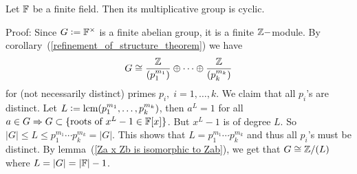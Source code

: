 \begin{dang}
    \begin{theorem}\label{multiplicative group of a finite field is cyclic}
        Let $\mathbb{F}$ be a finite field. Then its multiplicative group is cyclic.
    \end{theorem}
\end{dang}
Proof: Since $G\bydef\bb{F}^\times$ is a finite abelian group, it is a finite $\mathbb{Z}-$module. By corollary~(\ref{refinement_of_structure_theorem}) we have
\begin{equation}
    G\cong \frac{\mathbb{Z}}{(p_1^{m_1})}\oplus\cdots\oplus\frac{\mathbb{Z}}{(p_k^{m_k})}
\end{equation}
for (not necessarily distinct) primes $p_i,\;i=1,\dots,k$. We claim that all $p_i$'s are distinct. Let $L\bydef \text{lcm}(p_1^{m_1},\dots ,p_k^{m_k})$, then $a^L=1$ for all $a\in G\Rightarrow G\subset\{\text{roots of }x^L-1\in\mathbb{F}[x]\}$. But $x^L-1$ is of degree $L$. So $|G|\leq L\leq p_1^{m_1}\cdots p_k^{m_k}=|G|$. This shows that $L=p_1^{m_1}\cdots p_k^{m_k}$ and thus all $p_i$'s must be distinct. By lemma~(\ref{Za x Zb is isomorphic to Zab}), we get that $G\cong \mathbb{Z}/(L)$ where $L=|G|=|\mathbb{F}|-1$.

